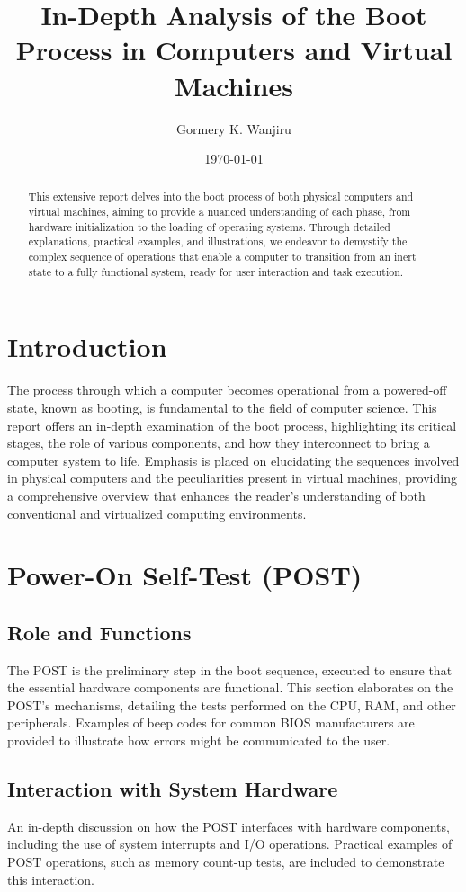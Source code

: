 \documentclass[12pt]{article}
\title{In-Depth Analysis of the Boot Process in Computers and Virtual Machines}
\author{Gormery K. Wanjiru}
\date{\today}
\begin{document}
\maketitle
\doublespacing

\begin{abstract}
This extensive report delves into the boot process of both physical computers and virtual machines, aiming to provide a nuanced understanding of each phase, from hardware initialization to the loading of operating systems. Through detailed explanations, practical examples, and illustrations, we endeavor to demystify the complex sequence of operations that enable a computer to transition from an inert state to a fully functional system, ready for user interaction and task execution.
\end{abstract}

\newpage
\tableofcontents
\newpage

\section{Introduction}
The process through which a computer becomes operational from a powered-off state, known as booting, is fundamental to the field of computer science. This report offers an in-depth examination of the boot process, highlighting its critical stages, the role of various components, and how they interconnect to bring a computer system to life. Emphasis is placed on elucidating the sequences involved in physical computers and the peculiarities present in virtual machines, providing a comprehensive overview that enhances the reader's understanding of both conventional and virtualized computing environments.

\section{Power-On Self-Test (POST)}
\subsection{Role and Functions}
The POST is the preliminary step in the boot sequence, executed to ensure that the essential hardware components are functional. This section elaborates on the POST's mechanisms, detailing the tests performed on the CPU, RAM, and other peripherals. Examples of beep codes for common BIOS manufacturers are provided to illustrate how errors might be communicated to the user.

\subsection{Interaction with System Hardware}
An in-depth discussion on how the POST interfaces with hardware components, including the use of system interrupts and I/O operations. Practical examples of POST operations, such as memory count-up tests, are included to demonstrate this interaction.
\end{document}
